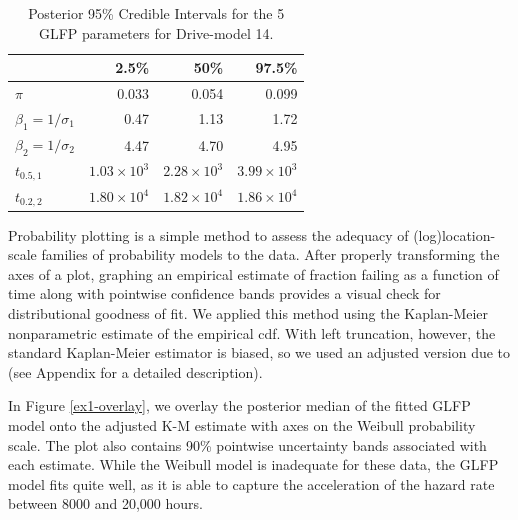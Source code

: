 \documentclass[aoas]{imsart}
\begin{document}
\begin{table}[H]
\centering
\begin{tabular}{lrrr}
  \hline
 & 2.5\% & 50\% & 97.5\% \\ 
  \hline
$\pi$ & 0.033 & 0.054 & 0.099 \\ 
 $\beta_1 = 1/\sigma_1 $ & 0.47 & 1.13 & 1.72 \\ 
  $\beta_2 = 1/\sigma_2$ & 4.47 & 4.70 & 4.95 \\ 
  $t_{0.5,1}$ & $1.03\times 10^3$  & $2.28 \times 10^3$ & $3.99 \times 10^3$\\ 
  $t_{0.2,2}$ & $1.80 \times 10^4$ & $1.82 \times 10^4$ & $1.86 \times 10^4$ \\ 
   \hline
\end{tabular}
\caption{Posterior 95\% Credible Intervals for the 5 GLFP parameters for Drive-model 14.}
\label{table:1}
\end{table}


Probability plotting is a simple method to assess the adequacy of (log)location-scale families of probability models to the data.  After properly transforming the axes of a plot, graphing an empirical estimate of fraction failing as a function of time along with pointwise confidence bands provides a visual check for distributional goodness of fit.  We applied this method using the Kaplan-Meier nonparametric estimate of the empirical cdf.  With left truncation, however, the standard Kaplan-Meier estimator is biased, so we used an adjusted version due to \citet[Chapter 11]{meeker} (see Appendix for a detailed description).   


In Figure \ref{ex1-overlay}, we overlay the posterior median of the fitted GLFP model onto the adjusted K-M estimate with axes on the Weibull probability scale.  The plot also contains 90\% pointwise uncertainty bands associated with each estimate. While the Weibull model is inadequate for these data, the GLFP model fits quite well, as it is able to capture the acceleration of the hazard rate between 8000 and 20,000 hours. %
\end{document}

